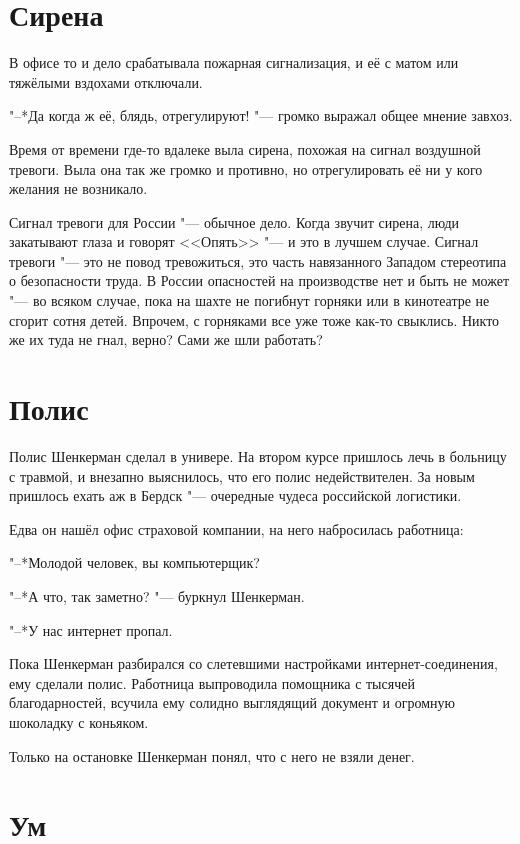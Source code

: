 \section{Сирена}

В офисе то и дело срабатывала пожарная сигнализация, и её с матом или тяжёлыми вздохами отключали.

"--*Да когда ж её, блядь, отрегулируют! "--- громко выражал общее мнение завхоз.

Время от времени где-то вдалеке выла сирена, похожая на сигнал воздушной тревоги.
Выла она так же громко и противно, но отрегулировать её ни у кого желания не возникало.

Сигнал тревоги для России "--- обычное дело.
Когда звучит сирена, люди закатывают глаза и говорят <<Опять>> "--- и это в лучшем случае.
Сигнал тревоги "--- это не повод тревожиться, это часть навязанного Западом стереотипа о безопасности труда.
В России опасностей на производстве нет и быть не может "--- во всяком случае, пока на шахте не погибнут горняки или в кинотеатре не сгорит сотня детей.
Впрочем, с горняками все уже тоже как-то свыклись.
Никто же их туда не гнал, верно?
Сами же шли работать?

\section{Полис}

Полис Шенкерман сделал в универе.
На втором курсе пришлось лечь в больницу с травмой, и внезапно выяснилось, что его полис недействителен.
За новым пришлось ехать аж в Бердск "--- очередные чудеса российской логистики.

Едва он нашёл офис страховой компании, на него набросилась работница:

"--*Молодой человек, вы компьютерщик?

"--*А что, так заметно? "--- буркнул Шенкерман.

"--*У нас интернет пропал.

Пока Шенкерман разбирался со слетевшими настройками интернет-соединения, ему сделали полис.
Работница выпроводила помощника с тысячей благодарностей, всучила ему солидно выглядящий документ и огромную шоколадку с коньяком.

Только на остановке Шенкерман понял, что с него не взяли денег.

\section{Ум}

